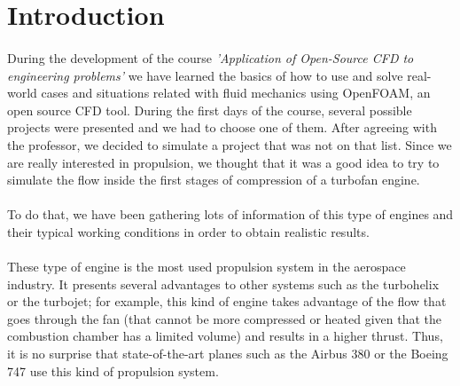 \section{Introduction}

\paragraph{}
During the development of the course \textit{'Application of Open-Source CFD to engineering problems'} we have learned the basics of how to use and solve real-world cases and situations related with fluid mechanics using OpenFOAM, an open source CFD tool. During the first days of the course, several possible projects were presented and we had to choose one of them. After agreeing with the professor, we decided to simulate a project that was not on that list. Since we are really interested in propulsion, we thought that it was a good idea to try to simulate the flow inside the first stages of compression of a turbofan engine.

\paragraph{}To do that, we have been gathering lots of information of this type of engines and their typical working conditions in order to obtain realistic results. 

\paragraph{}These type of engine is the most used propulsion system in the aerospace industry. It presents several advantages to other systems such as the turbohelix or the turbojet; for example, this kind of engine takes advantage of the flow that goes through the fan (that cannot be more compressed or heated given that the combustion chamber has a limited volume) and results in a higher thrust. Thus, it is no surprise that state-of-the-art planes such as the Airbus 380 or the Boeing 747 use this kind of propulsion system.